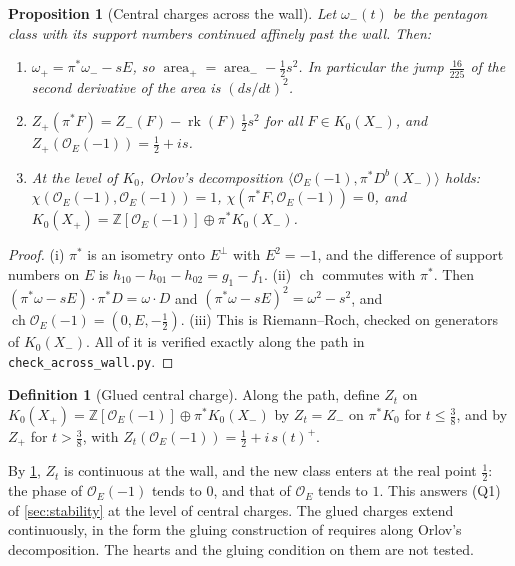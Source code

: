 \documentclass[11pt]{article}
\newtheorem{proposition}[theorem]{Proposition}
\theoremstyle{definition}
\newtheorem{definition}[theorem]{Definition}
\theoremstyle{remark}
\begin{document}
\begin{proposition}[Central charges across the wall]\label{prop:acrosswall}
Let $\omega_-(t)$ be the pentagon class with its support numbers continued affinely past the wall. Then:
\begin{enumerate}[label=(\roman*)]
\item $\omega_+=\pi^*\omega_--sE$, so $\operatorname{area}_+=\operatorname{area}_--\tfrac12s^2$. In particular the jump $\frac{16}{225}$ of the second
  derivative of the area \cite[\S12]{Awasthi-Family} is $(ds/dt)^2$.
\item $Z_+(\pi^*F)=Z_-(F)-\operatorname{rk}(F)\,\tfrac12s^2$ for all $F\in K_0(X_-)$, and $Z_+(\mathcal O_E(-1))=\tfrac12+is$.
\item At the level of $K_0$, Orlov's decomposition $\langle\mathcal O_E(-1),\pi^*D^b(X_-)\rangle$ holds:
  $\chi(\mathcal O_E(-1),\mathcal O_E(-1))=1$, $\chi(\pi^*F,\mathcal O_E(-1))=0$, and $K_0(X_+)=\mathbb Z[\mathcal O_E(-1)]\oplus\pi^*K_0(X_-)$.
\end{enumerate}
\end{proposition}
\begin{proof}
(i) $\pi^*$ is an isometry onto $E^\perp$ with $E^2=-1$, and the difference of support numbers on $E$ is
$h_{10}-h_{01}-h_{02}=g_1-f_1$. (ii) $\operatorname{ch}$ commutes with $\pi^*$. Then
$(\pi^*\omega-sE)\cdot\pi^*D=\omega\cdot D$ and $(\pi^*\omega-sE)^2=\omega^2-s^2$, and $\operatorname{ch}\mathcal O_E(-1)=(0,E,-\frac12)$.
(iii) This is Riemann--Roch, checked on generators of $K_0(X_-)$. All of it is verified exactly along the path in
\texttt{check\_across\_wall.py}.
\end{proof}

\begin{definition}[Glued central charge]\label{def:gluedZ}
Along the path, define $Z_t$ on $K_0(X_+)=\mathbb Z[\mathcal O_E(-1)]\oplus\pi^*K_0(X_-)$ by $Z_t=Z_-$ on $\pi^*K_0$ for
$t\le\frac38$, and by $Z_+$ for $t>\frac38$, with $Z_t(\mathcal O_E(-1))=\frac12+i\,s(t)^+$.
\end{definition}

By \cref{prop:acrosswall}, $Z_t$ is continuous at the wall, and the new class enters at the real point $\frac12$: the phase of
$\mathcal O_E(-1)$ tends to $0$, and that of $\mathcal O_E$ tends to $1$. This answers (Q1) of \cref{sec:stability} at the level
of central charges. The glued charges extend continuously, in the form the gluing construction of
\cite{CollinsPolishchuk2010} requires along Orlov's decomposition. The hearts and the gluing condition on them are not
tested.
\end{document}
